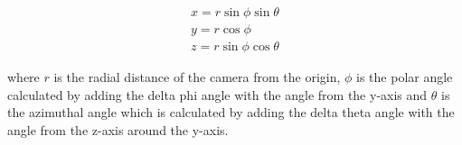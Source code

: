 
\begin{gather*}
	x = r\sin\phi\sin\theta \\
	y = r\cos\phi \\
	z = r\sin\phi\cos\theta
\end{gather*}

where $r$ is the radial distance of the camera from the origin, $\phi$ is the polar angle calculated by adding the delta phi angle with the angle from the y-axis and $\theta$ is the azimuthal angle which is calculated by adding the delta theta angle with the angle from the z-axis around the y-axis.
